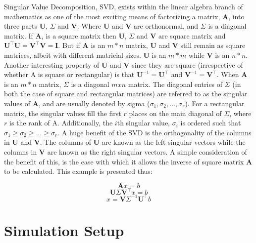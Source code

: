 \documentclass[preprint,12pt]{elsarticle}
\begin{document}
Singular Value Decomposition, SVD, exists within the linear algebra branch of mathematics as one of the most exciting means of factorizing a matrix, $\mathbf{A}$, into three parts $\mathbf{U}$, $\Sigma$ and $\mathbf{V}$. Where $\mathbf{U}$ and $\mathbf{V}$ are orthonormal, and $\Sigma$ is a diagonal matrix. If $\mathbf{A}$, is a square matrix then $\mathbf{U}$, $\Sigma$ and $\mathbf{V}$ are square matrix and $\mathbf{U}^{\intercal}\mathbf{U} = \mathbf{V}^{\intercal}\mathbf{V} = \mathbf{I}$. But if $\mathbf{A}$ is an $m * n$ matrix, $\mathbf{U}$ and $\mathbf{V}$ still remain as square matrices, albeit with different matricial sizes. $\mathbf{U}$ is an $m * m$ while $\mathbf{V}$ is an $n * n$. Another interesting property of $\mathbf{U}$ and $\mathbf{V}$ since they are square (irrespective of whether A is square or rectangular) is that $\mathbf{U}^{-1} = \mathbf{U}^{\intercal}$ and $\mathbf{V}^{-1} = \mathbf{V}^{\intercal}$. When $\mathbf{A}$ is an $m * n$ matrix, $\Sigma$ is a diagonal $m x n$ matrix. The diagonal entries of $\Sigma$ (in both the case of square and rectangular matrices) are referred to as the singular values of $\mathbf{A}$, and are usually denoted by sigma ($\sigma_{1}, \sigma_{2},..., \sigma_{r}$). For a rectangular matrix, the singular values fill the first $r$ places on the main diagonal of $\Sigma$, where $r$ is the rank of A. Additionally, the $i$th singular value, $\sigma_{i}$ is ordered such that $\sigma_{1} \geq \sigma_{2} \geq ...\geq \sigma_{r}$. A huge benefit of the SVD is the orthogonality of the columns in $\mathbf{U}$ and $\mathbf{V}$. The columns of $\mathbf{U}$ are known as the left singular vectors while the columns in $\mathbf{V}$ are known as the right singular vectors. A simple consideration of the benefit of this, is the ease with which it allows the inverse of square matrix $\mathbf{A}$ to be calculated. This example is presented thus:

\begin{equation}
 \mathbf{A}x = b
\end{equation}
\begin{equation}
 \mathbf{U} \Sigma \mathbf{V}^{\intercal} x = b
\end{equation}
\begin{equation}
 x = \mathbf{V} \Sigma^{-1} \mathbf{U}^{\intercal} b
\end{equation}

\section{Simulation Setup}\label{section:simulation_setup}
\end{document}
